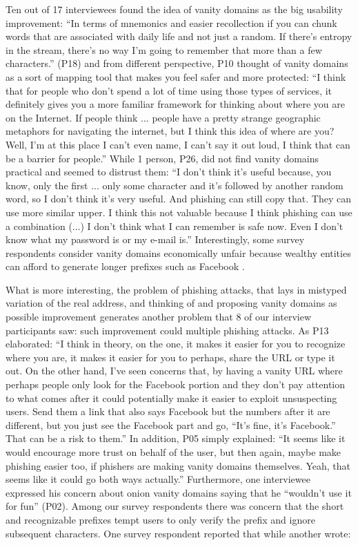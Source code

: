 Ten out of 17 interviewees found the idea of vanity domains as the big usability
improvement: ``In terms of mnemonics and easier recollection if you can chunk
words that are associated with daily life and not just a random. If there's
entropy in the stream, there's no way I'm going to remember that more than a few
characters.'' (P18) and from different perspective, P10 thought of vanity
domains as a sort of mapping tool that makes you feel safer and more protected:
``I think that for people who don't spend a lot of time using those types of
services, it definitely gives you a more familiar framework for thinking about
where you are on the Internet. If people think ... people have a pretty strange
geographic metaphors for navigating the internet, but I think this idea of where
are you? Well, I'm at this place I can't even name, I can't say it out loud, I
think that can be a barrier for people.'' While 1 person, P26, did not find
vanity domains practical and seemed to distrust them: ``I don't think it's
useful because, you know, only the first ... only some character and it's
followed by another random word, so I don't think it's very useful. And phishing
can still copy that. They can use more similar upper. I think this not valuable
because I think phishing can use a combination (...) I don't think what I can
remember is safe now. Even I don't know what my password is or my e-mail is.''
Interestingly, some  survey respondents consider vanity domains
economically unfair because wealthy entities can afford to generate longer
prefixes such as Facebook .


What is more interesting, the problem of phishing attacks, that lays in mistyped
variation of the real address, and thinking of and proposing vanity domains as
possible improvement generates another problem that 8 of our interview
participants saw: such improvement could multiple phishing attacks. As P13
elaborated: ``I think in theory, on the one, it makes it easier for you to
recognize where you are, it makes it easier for you to perhaps, share the URL or
type it out. On the other hand, I've seen concerns that, by having a vanity URL
where perhaps people only look for the Facebook portion and they don't pay
attention to what comes after it could potentially make it easier to exploit
unsuspecting users. Send them a link that also says Facebook but the numbers
after it are different, but you just see the Facebook part and go, ``It's fine,
it's Facebook.'' That can be a risk to them.''  In addition, P05 simply
explained:  ``It seems like it would encourage more trust on behalf of the user,
but then again, maybe make phishing easier too, if phishers are making vanity
domains themselves. Yeah, that seems like it could go both ways actually.''
Furthermore, one interviewee expressed his concern about onion vanity domains
saying that he ``wouldn't use it for fun'' (P02).  Among our survey respondents
there was concern that the short and recognizable prefixes tempt users to only
verify the prefix and ignore subsequent characters.  One survey respondent
reported that   while another wrote:


